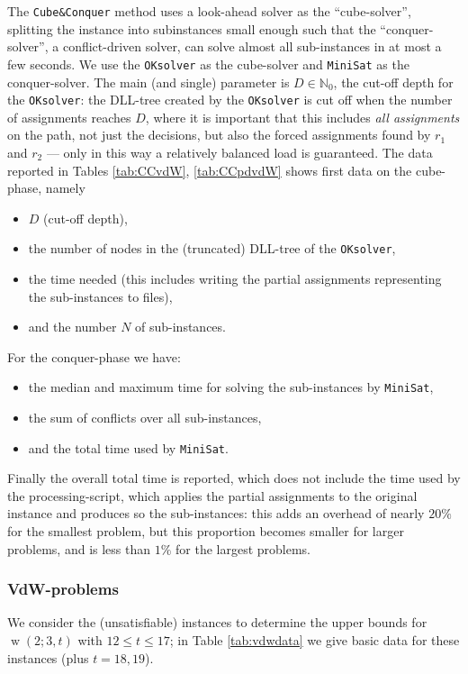 \documentclass[final,3p,times]{elsarticle}
\theoremstyle{definition}
\newcommand{\NN}{\mathbb{N}}
\newcommand{\NNZ}{\NN_0}
\newcommand{\oksolver}{\texttt{OKsolver}}
\newcommand{\minisat}{\texttt{MiniSat}}
\newcommand{\cubeconq}{\texttt{Cube\:\&\:Conquer}}
\DeclareMathOperator{\vdw}{w}
\begin{document}
The \cubeconq{} method uses a look-ahead solver as the ``cube-solver'', splitting the instance into subinstances small enough such that the ``conquer-solver'', a conflict-driven solver, can solve almost all sub-instances in at most a few seconds. We use the \oksolver{} as the cube-solver and \minisat{} as the conquer-solver. The main (and single) parameter is $D \in \NNZ$, the cut-off depth for the \oksolver: the DLL-tree created by the \oksolver{} is cut off when the number of assignments reaches $D$, where it is important that this includes \emph{all assignments} on the path, not just the decisions, but also the forced assignments found by $r_1$ and $r_2$ --- only in this way a relatively balanced load is guaranteed. The data reported in Tables \ref{tab:CCvdW}, \ref{tab:CCpdvdW} shows first data on the cube-phase, namely
\begin{itemize}
\item $D$ (cut-off depth),
\item the number of nodes in the (truncated) DLL-tree of the \oksolver,
\item the time needed (this includes writing the partial assignments representing the sub-instances to files),
\item and the number $N$ of sub-instances.
\end{itemize}
For the conquer-phase we have:
\begin{itemize}
\item the median and maximum time for solving the sub-instances by \minisat{},
\item the sum of conflicts over all sub-instances,
\item and the total time used by \minisat.
\end{itemize}
Finally the overall total time is reported, which does not include the time used by the processing-script, which applies the partial assignments to the original instance and produces so the sub-instances: this adds an overhead of nearly $20\%$ for the smallest problem, but this proportion becomes smaller for larger problems, and is less than $1\%$ for the largest problems.


\subsubsection{VdW-problems}
\label{sec:remsatcompvdw}

We consider the (unsatisfiable) instances to determine the upper bounds for $\vdw(2; 3,t)$ with $12 \le t \le 17$; in Table \ref{tab:vdwdata} we give basic data for these instances (plus $t=18,19$).
\end{document}
